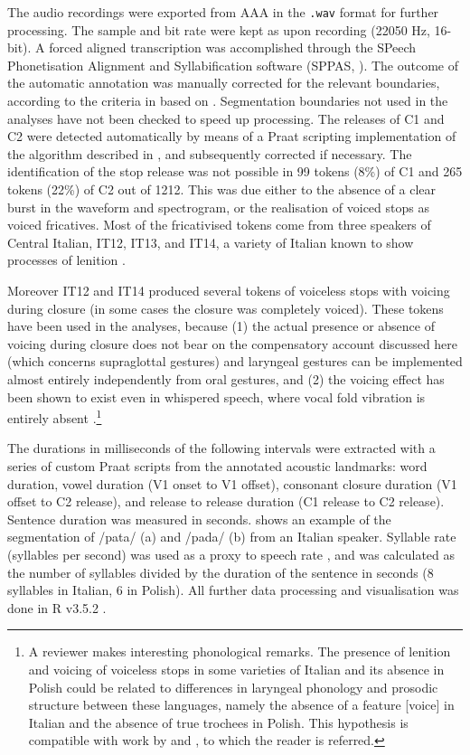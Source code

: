 \documentclass[charis]{glossa}
\begin{document}
The audio recordings were exported from AAA in the \texttt{.wav} format
for further processing. The sample and bit rate were kept as upon
recording (22050 Hz, 16-bit). A forced aligned transcription was
accomplished through the SPeech Phonetisation Alignment and
Syllabification software (SPPAS, \citealt{bigi2015}). The outcome of the
automatic annotation was manually corrected for the relevant boundaries,
according to the criteria in  based on
\citet{machac2009}. Segmentation boundaries not used in the analyses
have not been checked to speed up processing. The releases of C1 and C2
were detected automatically by means of a Praat scripting implementation
of the algorithm described in \citet{ananthapadmanabha2014}, and
subsequently corrected if necessary. The identification of the stop
release was not possible in 99 tokens (8\%) of C1 and 265 tokens (22\%)
of C2 out of 1212. This was due either to the absence of a clear burst
in the waveform and spectrogram, or the realisation of voiced stops as
voiced fricatives. Most of the fricativised tokens come from three
speakers of Central Italian, IT12, IT13, and IT14, a variety of Italian
known to show processes of lenition \citep{hualde2011}.

Moreover IT12 and IT14 produced several tokens of voiceless stops with
voicing during closure (in some cases the closure was completely
voiced). These tokens have been used in the analyses, because (1) the
actual presence or absence of voicing during closure does not bear on
the compensatory account discussed here (which concerns supraglottal
gestures) and laryngeal gestures can be implemented almost entirely
independently from oral gestures, and (2) the voicing effect has been
shown to exist even in whispered speech, where vocal fold vibration is
entirely absent
\citep{sharf1964}.\footnote{A reviewer makes interesting phonological remarks. The presence of lenition and voicing of voiceless stops in some varieties of Italian and its absence in Polish could be related to differences in laryngeal phonology and prosodic structure between these languages, namely the absence of a feature [voice] in Italian and the absence of true trochees in Polish. This hypothesis is compatible with work by \citet{schwartz2018} and \citet{schwartz2016}, to which the reader is referred.}

The durations in milliseconds of the following intervals were extracted
with a series of custom Praat scripts from the annotated acoustic
landmarks: word duration, vowel duration (V1 onset to V1 offset),
consonant closure duration (V1 offset to C2 release), and release to
release duration (C1 release to C2 release). Sentence duration was
measured in seconds.  shows an example of the
segmentation of /pata/ (a) and /pada/ (b) from an Italian speaker.
Syllable rate (syllables per second) was used as a proxy to speech rate
\citep{plug2018a}, and was calculated as the number of syllables divided
by the duration of the sentence in seconds (8 syllables in Italian, 6 in
Polish). All further data processing and visualisation was done in R
v3.5.2 \citep{wickham2017, r-core-team2018}.
\end{document}
